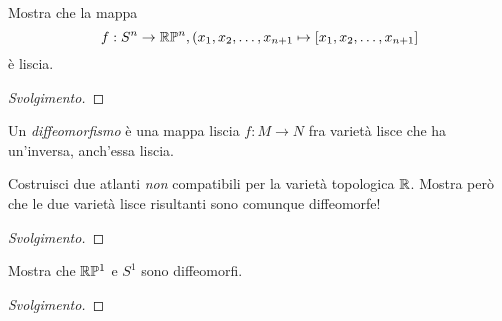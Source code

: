 \documentclass[a4paper, 12pt, italian]{article}
\begin{document}
\begin{exercise}
Mostra che la mappa
\[
f: S^n \to \mathbb{R}\mathbb{P}^n, (x_1, x_2, \ldots, x_{n+1} \mapsto
[x_1, x_2, \ldots, x_{n+1}]
\]
è liscia.
\begin{proof}[Svolgimento]

\end{proof}
\end{exercise}

Un \emph{diffeomorfismo} è una mappa liscia $f: M \to N$ fra varietà lisce
che ha un'inversa, anch'essa liscia.

\begin{exercise}
Costruisci due atlanti \emph{non} compatibili per la varietà topologica $\mathbb{R}$.
Mostra però che le due varietà lisce risultanti sono comunque diffeomorfe!
\begin{proof}[Svolgimento]

\end{proof}
\end{exercise}

\begin{exercise}
Mostra che $\mathbb{R}\mathbb{P}^1$ e $S^1$ sono diffeomorfi.
\begin{proof}[Svolgimento]

\end{proof}
\end{exercise}
\end{document}
